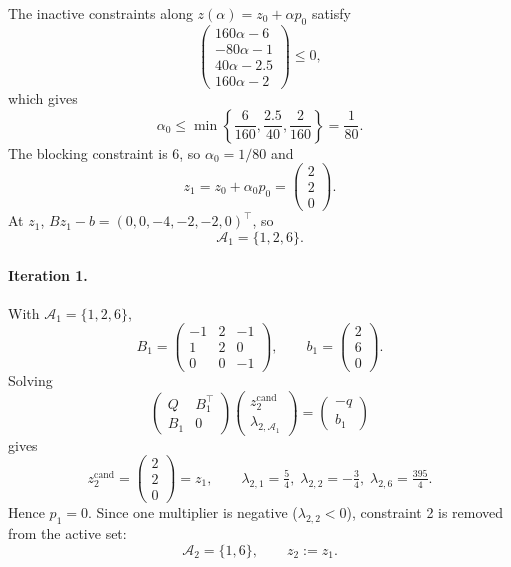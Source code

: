 \documentclass[11pt]{article}
\begin{document}
The inactive constraints along \(z(\alpha)=z_0+\alpha p_0\) satisfy
\[
\begin{pmatrix}
160\alpha-6\\[0.1em]-80\alpha-1\\[0.1em]40\alpha-2.5\\[0.1em]160\alpha-2
\end{pmatrix}\le 0,
\]
which gives
\[
\alpha_0 \le \min\!\left\{\frac{6}{160},\frac{2.5}{40},\frac{2}{160}\right\}
= \frac{1}{80}.
\]
The blocking constraint is 6, so \(\alpha_0 = 1/80\) and
\[
z_1 = z_0 + \alpha_0 p_0
    = \begin{pmatrix}2\\[0.1em]2\\[0.1em]0\end{pmatrix}.
\]
At \(z_1\),
\(
Bz_1 - b = (0,0,-4,-2,-2,0)^\top
\),
so
\[
\mathcal{A}_1 = \{1,2,6\}.
\]

\paragraph{Iteration 1.}
With \(\mathcal{A}_1 = \{1,2,6\}\),
\[
B_1 = \begin{pmatrix}
-1 & 2 & -1\\
 1 & 2 &  0\\
 0 & 0 & -1
\end{pmatrix},\qquad
b_1 = \begin{pmatrix}2\\6\\0\end{pmatrix}.
\]
Solving
\[
\begin{pmatrix}
Q & B_1^\top\\
B_1 & 0
\end{pmatrix}
\begin{pmatrix}
z_2^{\text{cand}}\\ \lambda_{2,\mathcal{A}_1}
\end{pmatrix}
=
\begin{pmatrix}
-q\\ b_1
\end{pmatrix}
\]
gives
\[
z_2^{\text{cand}} = \begin{pmatrix}2\\[0.1em]2\\[0.1em]0\end{pmatrix}
= z_1,\qquad
\lambda_{2,1} = \tfrac{5}{4},\;
\lambda_{2,2} = -\tfrac{3}{4},\;
\lambda_{2,6} = \tfrac{395}{4}.
\]
Hence \(p_1 = 0\). Since one multiplier is negative (\(\lambda_{2,2}<0\)),
constraint 2 is removed from the active set:
\[
\mathcal{A}_2 = \{1,6\},\qquad z_2 := z_1.
\]
\end{document}
